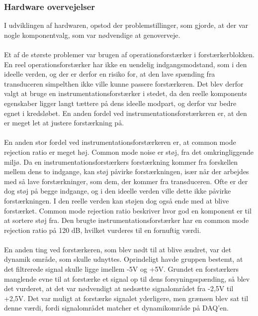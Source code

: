 \subsubsection{Hardware overvejelser}

I udviklingen af hardwaren, opstod der problemstillinger, som  gjorde, at der var nogle komponentvalg, som var nødvendige at genoverveje.\\
\\
Et af de største problemer var brugen af  operationsforstærker i forstærkerblokken. En reel operationsforstærker har ikke en uendelig indgangsmodstand, som i den ideelle verden, og der er derfor en risiko for, at den lave spænding fra transduceren simpelthen ikke ville kunne passere forstærkeren. Det blev derfor valgt at bruge en instrumentationsforstærker i stedet, da den reelle komponents egenskaber ligger langt tættere på dens ideelle modpart, og derfor var bedre egnet i kredsløbet. En anden fordel ved instrumentationsforstærkeren er, at den er meget let at justere forstærkning på.\\
\\
En anden stor fordel ved instrumentationsforstærkeren er, at common mode rejection ratio er meget høj. Common mode noise er støj, fra det omkringliggende miljø. Da en instrumentationsforstærkers forstærkning kommer fra forskellen mellem dens to indgange, kan støj påvirke forstærkningen, især når der arbejdes med så lave forstærkninger, som dem, der kommer fra transduceren. Ofte er der dog støj på begge indgange, og i den ideelle verden ville dette ikke påvirke forstærkningen. I den reelle verden kan støjen dog også ende med at blive forstærket. Common mode rejection ratio beskriver hvor god en komponent er til at sortere støj fra. Den brugte instrumentationsforstærker har en common mode rejection ratio på 120 dB, hvilket vurderes til en fornuftig værdi. \\
\\
En anden ting ved forstærkeren, som blev nødt til at blive ændret, var det dynamik område, som skulle udnyttes. Oprindeligt havde gruppen bestemt, at det filtrerede signal skulle ligge imellem -5V og +5V. Grundet en forstærkers manglende evne til at forstærke et signal op til dens forsyningsspænding, så blev det vurderet, at det var nødvendigt at nedsætte signalområdet fra -2,5V til +2,5V. Det var muligt at forstærke signalet yderligere, men grænsen blev sat til denne værdi, fordi signalområdet matcher et dynamikområde på DAQ'en.\\ 
\\
